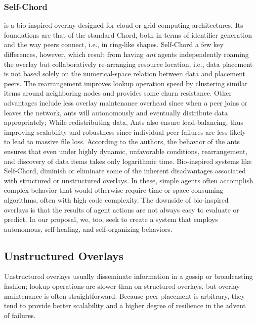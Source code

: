 \documentclass[runningheads]{llncs}
\begin{document}
\subsubsection{Self-Chord} \cite{selfchord} is a bio-inspired overlay designed for cloud or grid computing architectures. Its foundations are that of the standard Chord, both in terms of identifier generation and the way peers connect, i.e., in ring-like shapes. Self-Chord a few key differences, however, which result from having \textit{ant} agents independently roaming the overlay but collaboratively re-arranging resource location, i.e., data placement is not based solely on the numerical-space relation between data and placement peers. The rearrangement improves lookup operation speed by clustering similar items around neighboring nodes and provides some churn resistance. Other advantages include less overlay maintenance overhead since when a peer joins or leaves the network, ants will autonomously and eventually distribute data appropriately; While redistributing data, Ants also ensure load-balancing, thus improving scalability and robustness since individual peer failures are less likely to lead to massive file loss. According to the authors, the behavior of the ants ensures that even under highly dynamic, unfavorable conditions, rearrangement, and discovery of data items takes only logarithmic time. Bio-inspired systems like Self-Chord, diminish or eliminate some of the inherent disadvantages associated with structured or unstructured overlays. In these, simple agents often accomplish complex behavior that would otherwise require time or space consuming algorithms, often with high code complexity. The downside of bio-inspired overlays is that the results of agent actions are not always easy to evaluate or predict. In our proposal, we, too, seek to create a system that employs autonomous, self-healing, and self-organizing behaviors.

\subsection{Unstructured Overlays}
Unstructured overlays usually disseminate information in a gossip or broadcasting fashion; lookup operations are slower than on structured overlays, but overlay maintenance is often straightforward. Because peer placement is arbitrary, they tend to provide better scalability and a higher degree of resilience in the advent of failures.
\end{document}
